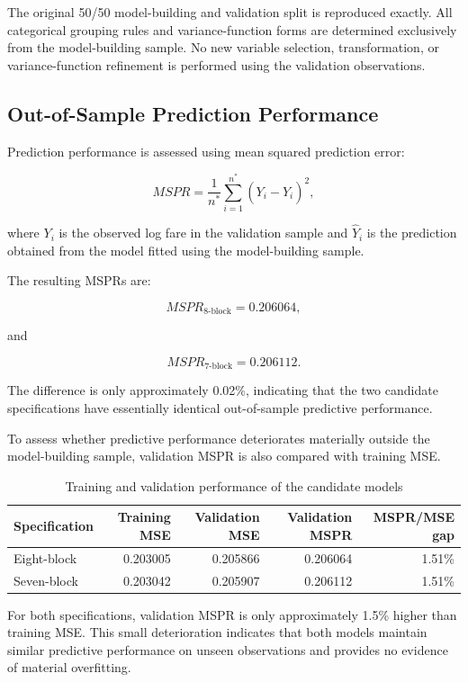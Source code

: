 \documentclass[11pt,a4paper]{article}
\begin{document}
The original 50/50 model-building and validation split is reproduced exactly. All categorical grouping rules and variance-function forms are determined exclusively from the model-building sample. No new variable selection, transformation, or variance-function refinement is performed using the validation observations.

\subsection{Out-of-Sample Prediction Performance}

Prediction performance is assessed using mean squared prediction error:

\[
MSPR=\frac{1}{n^*}\sum_{i=1}^{n^*}\left(Y_i-\hat{Y}_i\right)^2,
\]

where \(Y_i\) is the observed log fare in the validation sample and \(\hat{Y}_i\) is the prediction obtained from the model fitted using the model-building sample.

The resulting MSPRs are:

\[
MSPR_{\text{8-block}}=0.206064,
\]

and

\[
MSPR_{\text{7-block}}=0.206112.
\]

The difference is only approximately 0.02\%, indicating that the two candidate specifications have essentially identical out-of-sample predictive performance.

To assess whether predictive performance deteriorates materially outside the model-building sample, validation MSPR is also compared with training MSE.

\begin{table}[H]
\centering
\caption{Training and validation performance of the candidate models}
\label{tab:validation-performance}
\begin{tabular}{lrrrr}
\toprule
\textbf{Specification} & \textbf{Training MSE} & \textbf{Validation MSE} & \textbf{Validation MSPR} & \textbf{MSPR/MSE gap} \\
\midrule
Eight-block & 0.203005 & 0.205866 & 0.206064 & 1.51\% \\
Seven-block & 0.203042 & 0.205907 & 0.206112 & 1.51\% \\
\bottomrule
\end{tabular}
\end{table}

For both specifications, validation MSPR is only approximately 1.5\% higher than training MSE. This small deterioration indicates that both models maintain similar predictive performance on unseen observations and provides no evidence of material overfitting.
\end{document}
